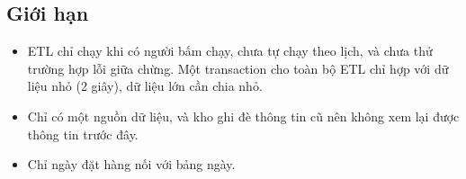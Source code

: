 \begin{table}[H]
\centering
\caption{Kết quả 44 phép kiểm tra sau khi nạp kho}
\label{tab:kt44}
\footnotesize

\end{table}

\begin{table}[H]
\centering
\caption{Kết quả 21 phép kiểm tra bảng Customer Snapshot}
\label{tab:kt21}
\footnotesize

\end{table}

\subsection{Giới hạn}
\begin{itemize}
    \item ETL chỉ chạy khi có người bấm chạy, chưa tự chạy theo lịch, và chưa thử trường hợp lỗi giữa chừng. Một transaction cho toàn bộ ETL chỉ hợp với dữ liệu nhỏ (2 giây), dữ liệu lớn cần chia nhỏ.
    \item Chỉ có một nguồn dữ liệu, và kho ghi đè thông tin cũ nên không xem lại được thông tin trước đây.
    \item Chỉ ngày đặt hàng nối với bảng ngày.
\end{itemize}
